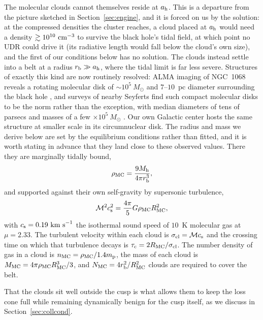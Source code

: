 \documentclass[preprint2]{aastex}
\newcommand{\msun}{M_{\odot}\xspace}
\begin{document}
The molecular clouds cannot themselves reside at $a_{\rm h}$. This is a departure from the picture sketched in Section~\ref{sec:engine}, and it is forced on us by the solution: at the compressed densities the cluster reaches, a cloud placed at $a_{\rm h}$ would need a density $\gtrsim 10^{10}~{\rm cm}^{-3}$ to survive the black hole's tidal field, at which point no UDR could drive it (its radiative length would fall below the cloud's own size), and the first of our conditions below has no solution. The clouds instead settle into a belt at a radius $r_{\rm b} \gg a_{\rm h}$, where the tidal limit is far less severe. Structures of exactly this kind are now routinely resolved: ALMA imaging of NGC~1068 reveals a rotating molecular disk of $\sim 10^{5}~\msun$ and $7$--$10$~pc diameter surrounding the black hole \citep{GarciaBurillo:2016a,Imanishi:2018a,Impellizzeri:2019a}, and surveys of nearby Seyferts find such compact molecular disks to be the norm rather than the exception, with median diameters of tens of parsecs and masses of a few $\times 10^{5}~\msun$ \citep{Combes:2019a,GarciaBurillo:2021a}. Our own Galactic center hosts the same structure at smaller scale in its circumnuclear disk. The radius and mass we derive below are set by the equilibrium conditions rather than fitted, and it is worth stating in advance that they land close to these observed values. There they are marginally tidally bound,
\begin{equation}
\rho_{\rm MC} = \frac{9 M_{\rm h}}{4 \pi r_{\rm b}^{3}},\label{eq:rhomc}
\end{equation}
and supported against their own self-gravity by supersonic turbulence,
\begin{equation}
{\cal M}^{2} c_{\rm s}^{2} = \frac{4 \pi}{5} G \rho_{\rm MC} R_{\rm MC}^{2},\label{eq:virial}
\end{equation}
with $c_{\rm s} = 0.19~{\rm km~s}^{-1}$ the isothermal sound speed of $10$~K molecular gas at $\mu = 2.33$. The turbulent velocity within each cloud is $\sigma_{\rm cl} = {\cal M} c_{\rm s}$ and the crossing time on which that turbulence decays is $\tau_{\rm c} = 2 R_{\rm MC}/\sigma_{\rm cl}$. The number density of gas in a cloud is $n_{\rm MC} = \rho_{\rm MC}/1.4 m_{\rm p}$, the mass of each cloud is $M_{\rm MC} = 4 \pi \rho_{\rm MC} R_{\rm MC}^{3}/3$, and $N_{\rm MC} = 4 r_{\rm b}^{2}/R_{\rm MC}^{2}$ clouds are required to cover the belt.

That the clouds sit well outside the cusp is what allows them to keep the loss cone full while remaining dynamically benign for the cusp itself, as we discuss in Section~\ref{sec:collcond}.
\end{document}
